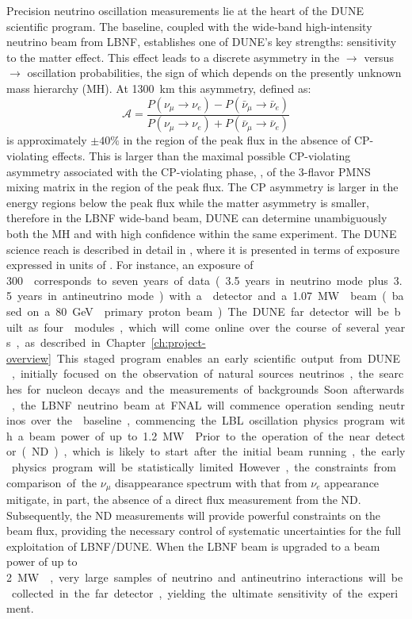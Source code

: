 Precision neutrino oscillation measurements lie at the heart of the DUNE scientific program.
The  baseline, coupled with the wide-band
high-intensity neutrino beam from LBNF, establishes one of DUNE's key
strengths: sensitivity to the matter effect. This effect leads to a
discrete asymmetry in the \numu $\to$ \nue versus \anumu $\to$ \anue
oscillation probabilities, the sign of which depends on the presently
unknown mass hierarchy (MH).  At \SI{1300}{\km} this asymmetry, defined as:
\begin{equation}
\mathcal{A} = \frac{ P(\nu_\mu \rightarrow \nu_e)-P(\bar{\nu}_\mu \rightarrow \bar{\nu}_e)}{P(\nu_\mu \rightarrow \nu_e)+P(\bar{\nu}_\mu \rightarrow \bar{\nu}_e)}
\end{equation}
is approximately $\pm 40\%$ in the region of the peak flux in the
absence of CP-violating effects. This is larger than the maximal
possible CP-violating asymmetry associated with the CP-violating
phase, \deltacp, of the 3-flavor PMNS mixing matrix in the region of
the peak flux. The CP asymmetry is larger in the energy regions below the peak
flux while the matter asymmetry is smaller, therefore in the LBNF
wide-band beam, DUNE can determine unambiguously both the MH and
\deltacp with high confidence within the same experiment.
The DUNE science reach is described in detail in \volphys, where it is presented 
in terms of  exposure expressed in units of \ktMWyr{}. For instance, an
exposure of \SI{300}\ktMWyr{} corresponds to seven years of data
(\num{3.5} years in neutrino mode plus \num{3.5} years in antineutrino
mode) with a  detector and a \SI{1.07}\MW{} beam (based on a \SI{80}\GeV{} primary proton beam).

The DUNE far detector will be built as four  modules, which will
come online over the course of several years, as described in Chapter~\ref{ch:project-overview}. 
This staged program enables an early scientific output from DUNE, 
initially focused on the observation of natural
sources neutrinos, the searches for nucleon decays and the
measurements of backgrounds. Soon afterwards, the LBNF neutrino
beam at FNAL will commence operation sending neutrinos over the 
baseline, commencing the LBL oscillation physics program with a beam power of up to \SI{1.2}\MW{}. 
Prior to the operation of the near detector (ND), which
is likely to start after the initial beam running, the early physics program
will be statistically limited. However, the constraints from comparison of the $\nu_\mu$
disappearance spectrum with that from $\nu_e$ appearance mitigate, in part,
the absence of a direct flux measurement from the ND. Subsequently, the ND
measurements will provide powerful constraints on the beam flux, providing the
necessary control of systematic uncertainties for the full exploitation of LBNF/DUNE. 
When the LBNF beam is upgraded to a beam power of up to \SI{2}\MW{}, very large samples of neutrino and antineutrino interactions
will be collected in the far detector, yielding the ultimate sensitivity of
the experiment.

